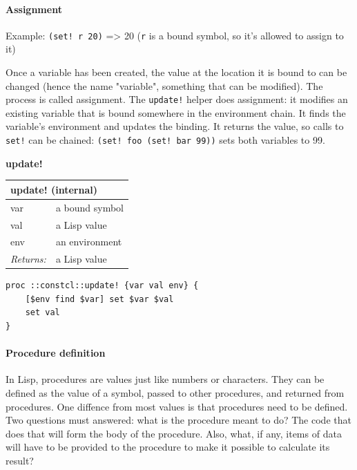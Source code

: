 \documentclass[twoside,9pt]{report}
\begin{document}
\paragraph{Assignment}
\label{assignment}

Example: \texttt{(set! r 20)} => 20 (\texttt{r} is a bound symbol, so it's allowed to assign
to it)

Once a variable has been created, the value at the location it is bound to can be changed (hence the name "variable", something that can be modified). The process is called assignment. The \texttt{update!} helper does assignment: it modifies an existing variable that is bound somewhere in the environment chain. It finds the variable's environment and updates the binding. It returns the value, so calls to \texttt{set!} can be chained: \texttt{(set! foo (set! bar 99))} sets both variables to 99.


\textbf{update!}

\begin{tabular}{ |l l| }
\hline
\multicolumn{2}{|l|}{update! (internal)} \\
\hline
var & a bound symbol \\
val & a Lisp value \\
env & an environment \\
\textit{Returns:} & a Lisp value \\
\hline
\end{tabular}

\noindent\makebox[\linewidth]{\rule{\linewidth}{0.4pt}}
\begin{lstlisting}
proc ::constcl::update! {var val env} {
    [$env find $var] set $var $val
    set val
}
\end{lstlisting}
\noindent\makebox[\linewidth]{\rule{\linewidth}{0.4pt}}
\paragraph{Procedure definition}
\label{procedure-definition}

In Lisp, procedures are values just like numbers or characters. They can be defined as the value of a symbol, passed to other procedures, and returned from procedures. One diffence from most values is that procedures need to be defined. Two questions must answered: what is the procedure meant to do? The code that does that will form the body of the procedure. Also, what, if any, items of data will have to be provided to the procedure to make it possible to calculate its result?
\end{document}
